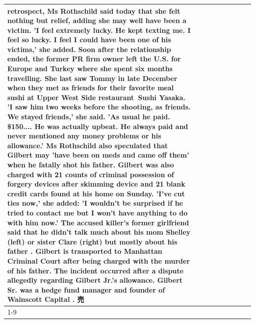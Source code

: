 \begin{table}[H]
\begin{tabular}{lllrlllll}
retrospect, Ms Rothschild said today that she felt nothing but relief, adding she may well have been a victim. 'I feel extremely lucky. He kept texting me. I feel so lucky. I feel I could have been one of his victims,' she added. Soon after the relationship ended, the former PR firm owner left the U.S. for Europe and Turkey where she spent six months  travelling. She last saw Tommy in late December when they met as friends for their favorite meal sushi at Upper West Side restaurant Sushi Yasaka. 'I saw him two weeks before the shooting, as friends. We stayed friends,' she said. 'As usual he paid. \$150.... He was actually upbeat. He always paid and never mentioned any money problems or his allowance.' Ms Rothschild also speculated that Gilbert may 'have been on meds and came off them' when he fatally shot his father. Gilbert was also charged with 21 counts of criminal possession of forgery devices after skimming device and 21 blank credit cards found at his home on Sunday. 'I've cut ties now,' she added: 'I wouldn’t be surprised if he tried to contact me but I won’t have anything to do with him now.' The accused killer's former girlfriend said that he didn't talk much about his mom Shelley (left) or sister Clare (right) but mostly about his father . Gilbert is transported to Manhattan Criminal Court  after being charged with the murder of his father. The incident occurred after a dispute allegedly regarding Gilbert Jr.'s allowance. Gilbert Sr. was a hedge fund manager and founder of Wainscott Capital . 売 \\
\cline{1-9} \cline{2-9}

\end{tabular}
\end{table}
